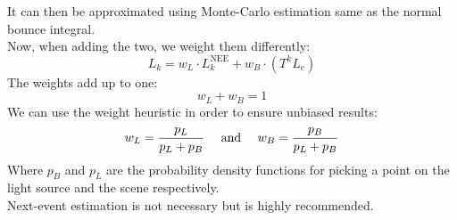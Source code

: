 \documentclass[12pt]{article}
\begin{document}
It can then be approximated using Monte-Carlo
estimation same as the normal bounce integral. \\

Now, when adding the two, we weight them differently:
\[ L_k = w_L \cdot L_k^\text{NEE} 
+ w_B \cdot (T^k L_e) \]
The weights add up to one:
\[ w_L + w_B = 1 \]
We can use the weight heuristic in order 
to ensure unbiased results:
\[ w_L = \dfrac{p_L}{p_L + p_B}
\quad \text{ and } \quad
w_B = \dfrac{p_B}{p_L + p_B} \]
Where $p_B$ and $p_L$ are the probability density 
functions for picking a point on the light source
and the scene respectively. \\

Next-event estimation is not necessary but is
highly recommended. \\
\end{document}
